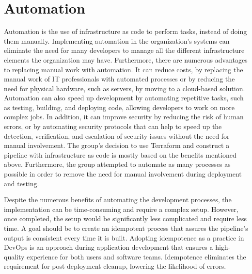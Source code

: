 




\section{Automation}
Automation is the use of \gls{infrastructure as code} to perform tasks, instead of doing them manually. Implementing automation in the organization's systems can eliminate the need for many developers to manage all the different infrastructure elements the organization may have. Furthermore, there are numerous advantages to replacing manual work with automation. It can reduce costs, by replacing the manual work of IT professionals with automated processes or by reducing the need for physical hardware, such as servers, by moving to a cloud-based solution. Automation can also speed up development by automating repetitive tasks, such as testing, building, and deploying code, allowing developers to work on more complex jobs. In addition, it can improve security by reducing the risk of human errors, or by automating security protocols that can help to speed up the detection, verification, and escalation of security issues without the need for manual involvement. The group's decision to use Terraform and construct a pipeline with \gls{infrastructure as code} is mostly based on the benefits mentioned above. Furthermore, the group attempted to automate as many processes as possible in order to remove the need for manual involvement during deployment and testing. \cite{automation}

Despite the numerous benefits of automating the development processes, the implementation can be time-consuming and require a complex setup. However, once completed, the setup would be significantly less complicated and require less time. A goal should be to create an idempotent process that assures the pipeline's output is consistent every time it is built. Adopting idempotence as a practice in DevOps is an approach during application development that ensures a high-quality experience for both users and software teams. Idempotence eliminates the requirement for post-deployment cleanup, lowering the likelihood of errors. \cite{idempotent}

